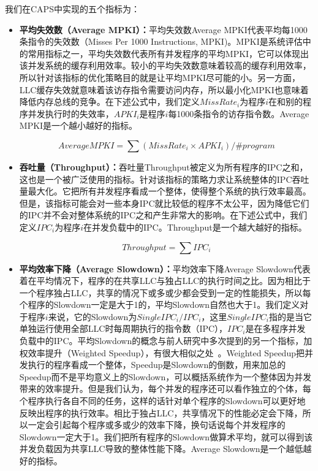 我们在CAPS中实现的五个指标为：

\begin{itemize}

\item \textbf{平均失效数（Average MPKI）：}平均失效数Average MPKI代表平均每1000条指令的失效数（Misses Per 1000 Instructions, MPKI)。MPKI是系统评估中的常用指标之一，平均失效数代表所有并发程序的平均MPKI，它可以体现出该并发系统的缓存利用效率。较小的平均失效数意味着较高的缓存利用效率，所以针对该指标的优化策略目的就是让平均MPKI尽可能的小。另一方面，LLC缓存失效就意味着该访存指令需要访问内存，所以最小化MPKI也意味着降低内存总线的竞争。在下述公式中，我们定义$MissRate_i$为程序$i$在和别的程序并发执行时的失效率，$APKI_i$是程序$i$每1000条指令的访存指令数。Average MPKI是一个越小越好的指标。

\begin{equation}
AverageMPKI = \sum ( MissRate_i \times APKI_i ) / \#program
\label{eq:mn}
\end{equation}
	
\item \textbf{吞吐量（Throughput）：}吞吐量Throughput被定义为所有程序的IPC之和，这也是一个被广泛使用的指标。针对该指标的策略力求让系统整体的IPC吞吐量最大化。它把所有并发程序看成一个整体，使得整个系统的执行效率最高。但是，该指标可能会对一些本身IPC就比较低的程序不太公平，因为降低它们的IPC并不会对整体系统的IPC之和产生非常大的影响。在下述公式中，我们定义$IPC_i$为程序$i$在并发负载中的IPC。Throughput是一个越大越好的指标。

\begin{equation}
	Throughput = \sum IPC_i
	\label{eq:IPCsum}
\end{equation}

\item \textbf{平均效率下降（Average Slowdown）：}平均效率下降Average Slowdown代表着在平均情况下，程序的在共享LLC与独占LLC的执行时间之比。因为相比于一个程序独占LLC，共享的情况下或多或少都会受到一定的性能损失，所以每个程序的Slowdown一定是大于1的，平均Slowdown自然也大于1。我们定义对于程序$i$来说，它的Slowdown为$SingleIPC_i/IPC_i$，这里$SingleIPC_i$指的是当它单独运行使用全部LLC时每周期执行的指令数（IPC），$IPC_i$是在多程序并发负载中的IPC。平均Slowdown的概念与前人研究中多次提到的另一个指标，加权效率提升（Weighted Speedup），有很大相似之处~\parencite{snavely2000symbiotic,qureshi2006utility}。Weighted Speedup把并发执行的程序看成一个整体，Speedup是Slowdown的倒数，用来加总的Speedup而不是平均意义上的Slowdown，可以概括系统作为一个整体因为并发带来的效率提升。但是我们认为，每个并发的程序还可以看作独立的个体，每个程序执行各自不同的任务，这样的话针对单个程序的Slowdown可以更好地反映出程序的执行效率。相比于独占LLC，共享情况下的性能必定会下降，所以一定会引起每个程序或多或少的效率下降，换句话说每个并发程序的Slowdown一定大于1。我们把所有程序的Slowdown做算术平均，就可以得到该并发负载因为共享LLC导致的整体性能下降。Average Slowdown是一个越低越好的指标。


\end{itemize}
